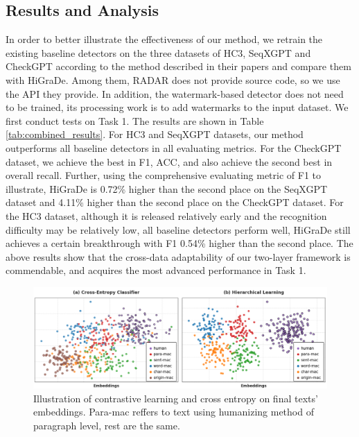 \documentclass[11pt]{article}
\begin{document}
	\subsection{Results and Analysis}
	In order to better illustrate the effectiveness of our method, we retrain the existing baseline detectors on the three datasets of HC3, SeqXGPT and CheckGPT according to the method described in their papers and compare them with HiGraDe. Among them, RADAR does not provide source code, so we use the API they provide. In addition, the watermark-based detector does not need to be trained, its processing work is to add watermarks to the input dataset. We first conduct tests on Task 1. The results are shown in Table \ref{tab:combined_results}. For HC3 and SeqXGPT datasets, our method outperforms all baseline detectors in all evaluating metrics. For the CheckGPT dataset, we achieve the best in F1, ACC, and also achieve the second best in overall recall. Further, using the comprehensive evaluating metric of F1 to illustrate, HiGraDe is 0.72\% higher than the second place on the SeqXGPT dataset and 4.11\% higher than the second place on the CheckGPT dataset. For the HC3 dataset, although it is released relatively early and the recognition difficulty may be relatively low, all baseline detectors perform well, HiGraDe still achieves a certain breakthrough with F1 0.54\% higher than the second place. The above results show that the cross-data adaptability of our two-layer framework is commendable, and acquires the most advanced performance in Task 1.
	\begin{figure}
		\centering
		\includegraphics[width=\linewidth]{pics/classify.png}
		\caption{Illustration of contrastive learning and cross entropy on final texts' embeddings. Para-mac reffers to text using humanizing method of paragraph level, rest are the same.}
	\label{fig:classify_compare}
	\end{figure}
\end{document}
